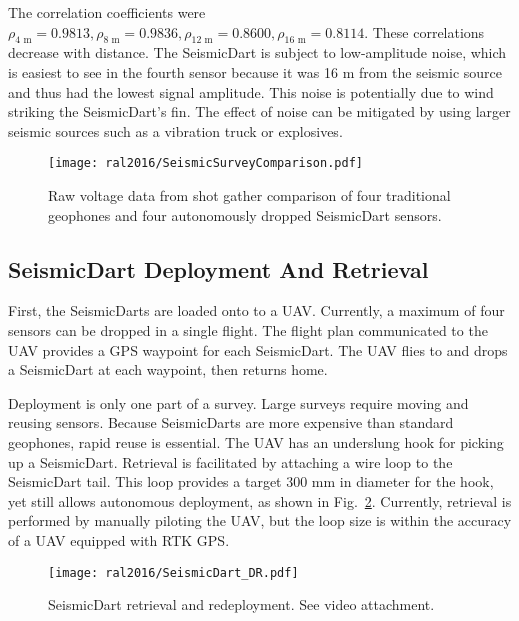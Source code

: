 The correlation coefficients were $\rho_{\text{4 m}}  =  0.9813, \rho_{\text{8 m}}  =  0.9836, \rho_{\text{12 m}}  =  0.8600, \rho_{\text{16 m}}  = 0.8114$.
These correlations decrease with distance.
The SeismicDart is subject to low-amplitude noise, which is easiest to see in the fourth sensor because it was 16 m from the seismic source and thus had the lowest signal amplitude.
This noise is potentially due to wind striking the SeismicDart's fin.
The effect of noise can be mitigated by using larger seismic sources such as a vibration truck or explosives.

\begin{figure} \centering
  {\texttt{[image: ral2016/SeismicSurveyComparison.pdf]}}
 \caption{Raw voltage data from shot gather comparison of four traditional geophones and four autonomously dropped SeismicDart sensors.
 \label{fig:shotgather_auto_drop}}
\end{figure}

\subsection{SeismicDart Deployment And Retrieval}
First, the SeismicDarts are loaded onto to a UAV.
Currently, a maximum of four sensors can be dropped in a single flight.
The flight plan communicated to the UAV provides a GPS waypoint for each SeismicDart.
The UAV flies to and drops a SeismicDart at each waypoint, then returns home.

Deployment is only one part of a survey.
Large surveys require moving and reusing sensors.
Because SeismicDarts are more expensive than standard geophones, rapid reuse is essential.
The UAV has an underslung hook for picking up a SeismicDart.
Retrieval is facilitated by attaching a wire loop to the SeismicDart tail.
This loop provides a target 300 mm in diameter for the hook, yet still allows autonomous deployment, as shown in Fig.~\ref{fig:SeismicDart_DR}.
Currently, retrieval is performed by manually piloting the UAV, but the loop size is within the accuracy of a UAV equipped with RTK GPS.

\begin{figure} \centering
	{\texttt{[image: ral2016/SeismicDart\_DR.pdf]}}
	\caption{
		SeismicDart retrieval and redeployment.
		See video attachment.
	\label{fig:SeismicDart_DR}}
\end{figure}
